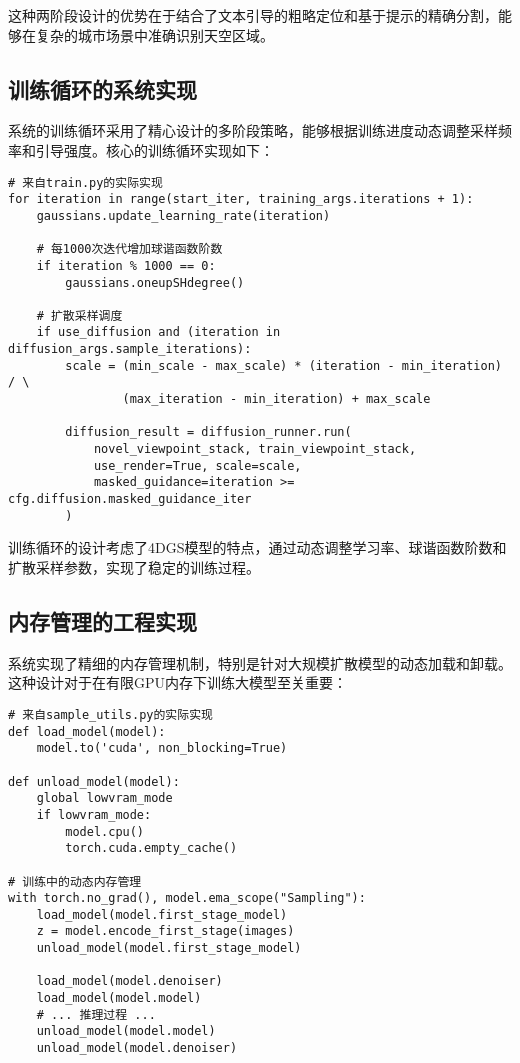 这种两阶段设计的优势在于结合了文本引导的粗略定位和基于提示的精确分割，能够在复杂的城市场景中准确识别天空区域。

\subsection{训练循环的系统实现}

系统的训练循环采用了精心设计的多阶段策略，能够根据训练进度动态调整采样频率和引导强度。核心的训练循环实现如下：

\begin{verbatim}
# 来自train.py的实际实现
for iteration in range(start_iter, training_args.iterations + 1):
    gaussians.update_learning_rate(iteration)
    
    # 每1000次迭代增加球谐函数阶数
    if iteration % 1000 == 0:
        gaussians.oneupSHdegree()
    
    # 扩散采样调度
    if use_diffusion and (iteration in diffusion_args.sample_iterations):
        scale = (min_scale - max_scale) * (iteration - min_iteration) / \
                (max_iteration - min_iteration) + max_scale
        
        diffusion_result = diffusion_runner.run(
            novel_viewpoint_stack, train_viewpoint_stack, 
            use_render=True, scale=scale,
            masked_guidance=iteration >= cfg.diffusion.masked_guidance_iter
        )
\end{verbatim}

训练循环的设计考虑了4DGS模型的特点，通过动态调整学习率、球谐函数阶数和扩散采样参数，实现了稳定的训练过程。

\subsection{内存管理的工程实现}

系统实现了精细的内存管理机制，特别是针对大规模扩散模型的动态加载和卸载。这种设计对于在有限GPU内存下训练大模型至关重要：

\begin{verbatim}
# 来自sample_utils.py的实际实现
def load_model(model):
    model.to('cuda', non_blocking=True)

def unload_model(model):
    global lowvram_mode
    if lowvram_mode:
        model.cpu()
        torch.cuda.empty_cache()

# 训练中的动态内存管理
with torch.no_grad(), model.ema_scope("Sampling"):
    load_model(model.first_stage_model)
    z = model.encode_first_stage(images)
    unload_model(model.first_stage_model)
    
    load_model(model.denoiser)
    load_model(model.model)
    # ... 推理过程 ...
    unload_model(model.model)
    unload_model(model.denoiser)
\end{verbatim}

